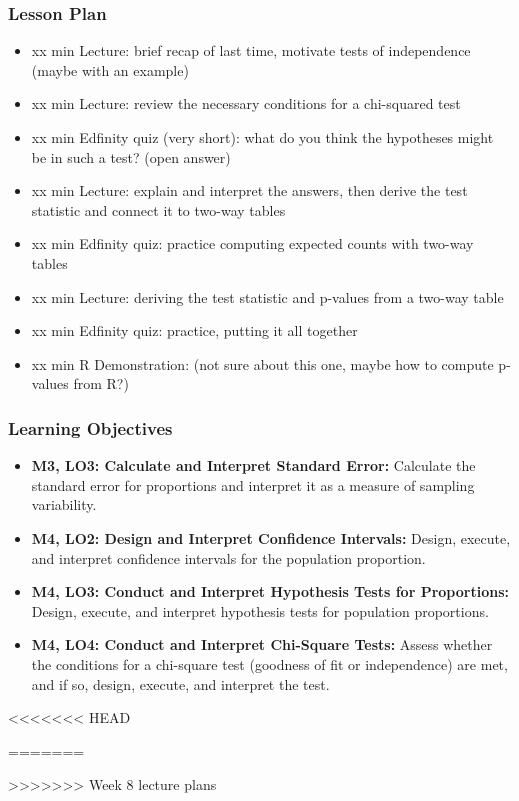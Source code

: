 \begin{frame}
    \frametitle{Lesson Plan}
    \begin{itemize}
        \item xx min Lecture: brief recap of last time, motivate tests of independence (maybe with an example)
        \item xx min Lecture: review the necessary conditions for a chi-squared test
        \item xx min Edfinity quiz (very short): what do you think the hypotheses might be in such a test? (open answer)
        \item xx min Lecture: explain and interpret the answers, then derive the test statistic and connect it to two-way tables
        \item xx min Edfinity quiz: practice computing expected counts with two-way tables
        \item xx min Lecture: deriving the test statistic and p-values from a two-way table
        \item xx min Edfinity quiz: practice, putting it all together
        \item xx min R Demonstration: (not sure about this one, maybe how to compute p-values from R?)
    \end{itemize}
\end{frame}
            
\begin{frame}
    \frametitle{Learning Objectives}
    \begin{itemize}
        \item \textbf{M3, LO3: Calculate and Interpret Standard Error:} Calculate the standard error for proportions and interpret it as a measure of sampling variability.
        \item \textbf{M4, LO2: Design and Interpret Confidence Intervals:} Design, execute, and interpret confidence intervals for the population proportion.
        \item \textbf{M4, LO3: Conduct and Interpret Hypothesis Tests for Proportions:} Design, execute, and interpret hypothesis tests for population proportions.
        \item \textbf{M4, LO4: Conduct and Interpret Chi-Square Tests:} Assess whether the conditions for a chi-square test (goodness of fit or independence) are met, and if so, design, execute, and interpret the test.
    \end{itemize}
\end{frame}
    
<<<<<<< HEAD

=======

>>>>>>> Week 8 lecture plans
